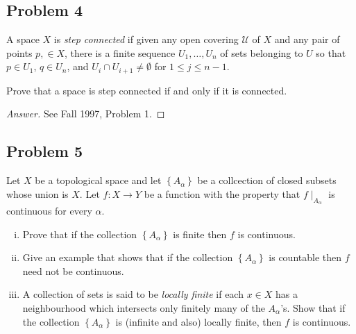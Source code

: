 \documentclass[12pt]{article}
\newcommand{\ita}[1]{\textit{#1}}
\newcommand\setb[1]{\left \{ #1 \right \}}
\theoremstyle{definition}
\begin{document}
\subsection{Problem 4}
A space $X$ is \ita{step connected} if given any open covering $\mathcal{U}$ of $X$ and any pair of points $p , \in X$, there is a finite sequence $U_1 , \dotsc , U_n$ of sets belonging to $U$ so that $p \in U_1$, $q \in U_n$, and $U_i \cap U_{i+1} \neq \emptyset$ for $1 \leq j \leq n - 1$.

Prove that a space is step connected if and only if it is connected.
\begin{proof}[Answer]
    See Fall 1997, Problem 1.
\end{proof}
\subsection{Problem 5}
Let $X$ be a topological space and let $\setb{ A_{\alpha } }$ be a collcection of closed subsets whose union is $X$. Let $f : X \to Y$ be a function with the property that $f \mid_{A_{\alpha}}$ is continuous for every $\alpha$.
\begin{enumerate}[(i)]
    \item Prove that if the collection $\setb{ A_{\alpha} }$ is finite then $f$ is continuous.
    \item Give an example that shows that if the collection $\setb{ A_{\alpha} }$ is countable then $f$ need not be continuous.
    \item A collection of sets is said to be \ita{locally finite} if each $x \in X$ has a neighbourhood which intersects only finitely many of the $A_{\alpha}$'s. Show that if the collection $\setb{ A_{\alpha} }$ is (infinite and also) locally finite, then $f$ is continuous.
\end{enumerate}
\end{document}
